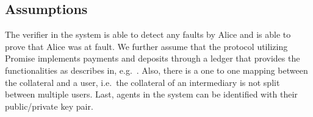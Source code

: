 \documentclass[runningheads]{llncs}
\newcommand{\sys}{Promise\xspace}
\newcommand{\rk}[1]{\todo[linecolor=red,backgroundcolor=red!25,bordercolor=blue,inline,caption={}]{Comment by Rami: #1}}
\newcommand{\dom}[1]{\todo[linecolor=green,backgroundcolor=green!25,bordercolor=green,inline,caption={}]{Comment by Dominik: #1}}
\begin{document}


\subsection{Assumptions}

The verifier in the system is able to detect any faults by Alice and is able to prove that Alice was at fault.
We further assume that the protocol utilizing \sys implements payments and deposits through a ledger that provides the functionalities as describes in, e.g.~\cite{garay2016bitcoin}.
Also, there is a one to one mapping between the collateral and a user, i.e.\ the collateral of an intermediary is not split between multiple users.
Last, agents in the system can be identified with their public/private key pair.


\end{document}

